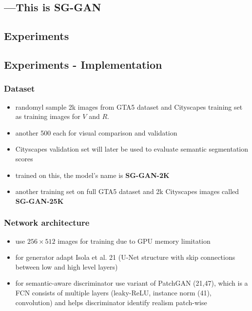 \documentclass[]{article}
\begin{document}
\newpage

\subsection{---This is SG-GAN}
\subsection{Experiments}

\subsection{Experiments - Implementation}

\subsubsection{Dataset}
\begin{itemize}
	\item randomyl sample 2k images from GTA5 dataset and Cityscapes training set as training images for $V$ and $R$.
	\item another 500 each for visual comparison and validation
	\item Cityscapes validation set will later be used to evaluate semantic segmentation scores
	\item trained on this, the model's name is \textbf{SG-GAN-2K}
	\item another training set on full GTA5 dataset and 2k Cityscapes images called \textbf{SG-GAN-25K}
\end{itemize}

\subsubsection{Network architecture}
\begin{itemize}
	\item use $256 \times 512$ images for training due to GPU memory limitation
	\item for generator adapt Isola et al. 21 (U-Net structure with skip connections between low and high level layers)
	\item for semantic-aware discriminator use variant of PatchGAN (21,47), which is a FCN consists of multiple layers (leaky-ReLU, instance norm (41), convolution) and helps discriminator identify realism patch-wise
\end{itemize}
\end{document}

